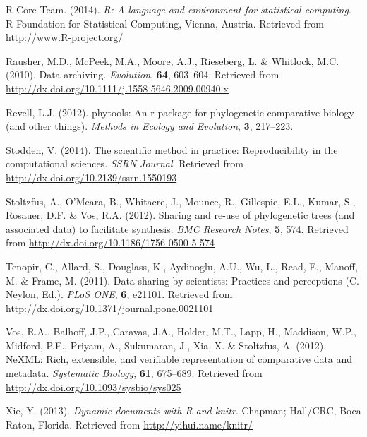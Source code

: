 \documentclass[author-year, review, 11pt]{components/elsarticle} %
\begin{document}
R Core Team. (2014). \emph{R: A language and environment for statistical
computing}. R Foundation for Statistical Computing, Vienna, Austria.
Retrieved from \url{http://www.R-project.org/}

Rausher, M.D., McPeek, M.A., Moore, A.J., Rieseberg, L. \& Whitlock,
M.C. (2010). Data archiving. \emph{Evolution}, \textbf{64}, 603--604.
Retrieved from \url{http://dx.doi.org/10.1111/j.1558-5646.2009.00940.x}

Revell, L.J. (2012). phytools: An r package for phylogenetic comparative
biology (and other things). \emph{Methods in Ecology and Evolution},
\textbf{3}, 217--223.

Stodden, V. (2014). The scientific method in practice: Reproducibility
in the computational sciences. \emph{SSRN Journal}. Retrieved from
\url{http://dx.doi.org/10.2139/ssrn.1550193}

Stoltzfus, A., O'Meara, B., Whitacre, J., Mounce, R., Gillespie, E.L.,
Kumar, S., Rosauer, D.F. \& Vos, R.A. (2012). Sharing and re-use of
phylogenetic trees (and associated data) to facilitate synthesis.
\emph{BMC Research Notes}, \textbf{5}, 574. Retrieved from
\url{http://dx.doi.org/10.1186/1756-0500-5-574}

Tenopir, C., Allard, S., Douglass, K., Aydinoglu, A.U., Wu, L., Read,
E., Manoff, M. \& Frame, M. (2011). Data sharing by scientists:
Practices and perceptions (C. Neylon, Ed.). \emph{PLoS ONE}, \textbf{6},
e21101. Retrieved from
\url{http://dx.doi.org/10.1371/journal.pone.0021101}

Vos, R.A., Balhoff, J.P., Caravas, J.A., Holder, M.T., Lapp, H.,
Maddison, W.P., Midford, P.E., Priyam, A., Sukumaran, J., Xia, X. \&
Stoltzfus, A. (2012). NeXML: Rich, extensible, and verifiable
representation of comparative data and metadata. \emph{Systematic
Biology}, \textbf{61}, 675--689. Retrieved from
\url{http://dx.doi.org/10.1093/sysbio/sys025}

Xie, Y. (2013). \emph{Dynamic documents with R and knitr}. Chapman;
Hall/CRC, Boca Raton, Florida. Retrieved from
\url{http://yihui.name/knitr/}
\end{document}
